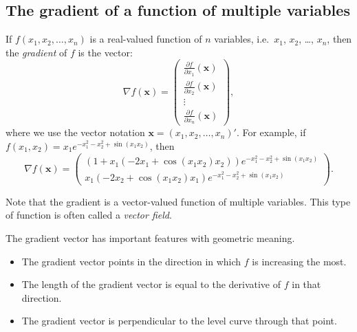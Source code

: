 
\subsection*{The gradient of a function of multiple variables}

If $f(x_1, x_2, \ldots, x_n)$ is a real-valued function of $n$ variables, i.e.\ $x_1$, $x_2$, \ldots, $x_n$, then the
{\em gradient} of $f$ is the vector:
$$
   \nabla f(\mathbf{x} )
      = \left( \begin{array}{c}  \frac{ \partial f}{ \partial x_1} (\mathbf{x} ) \\
                                             \frac{ \partial f}{ \partial x_2} (\mathbf{x} ) \\
                                                                      \vdots                                \\
                                              \frac{ \partial f}{ \partial x_n} (\mathbf{x} )
                     \end{array} \right),
$$
where we use the vector notation $\mathbf{x} = (x_1, x_2, \ldots, x_n)'$.
For example, if 
$f(x_1,x_2) = x_1e^{-x_1^2-x_2^2+\sin(x_1x_2)}$, then
$$
\nabla f(\mathbf{x}) 
= \left( \begin{array}{c} 
(1+x_1(-2x_1+\cos(x_1x_2)x_2))  e^{-x_1^2-x_2^2+\sin(x_1x_2)}\\
    x_1(-2x_2+\cos(x_1x_2)x_1) e^{-x_1^2-x_2^2+\sin(x_1x_2)}   
\end{array} \right).
$$


Note that the gradient is a vector-valued function of multiple variables. This type of function is
often called a {\em vector field}.

The gradient vector has important features with geometric meaning.
\begin{itemize}
\item The gradient vector points in the direction in which $f$ is increasing the most.
\item The length of the gradient vector is equal to the derivative of $f$ in that direction.
\item The gradient vector is perpendicular to the level curve through that point.
\end{itemize}


